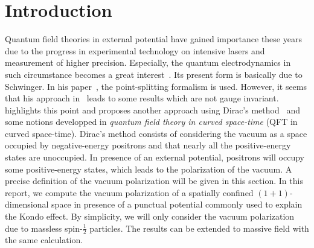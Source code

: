 \section{Introduction}
Quantum field theories in external potential have gained importance these years due to the progress in experimental technology on intensive lasers and measurement of higher precision.
Especially, the quantum electrodynamics in such circumstance becomes a great interest~\cite{Mohr1998}. 
Its present form is basically due to Schwinger. 
In his paper~\cite{Schwinger1951}, the point-splitting formalism is used. 
However, it seems that his approach in~\cite{Schwinger1951} leads to some results which are not gauge invariant. 
\cite{Zahn2015} highlights this point and proposes another approach using Dirac's method~\cite{Dirac1934} and some notions developped in \textit{quantum field theory in curved space-time} (QFT in curved space-time). 
Dirac's method consists of considering the vacuum as a space occupied by negative-energy positrons and that nearly all the positive-energy states are unoccupied.
In presence of an external potential, positrons will occupy some positive-energy states, which leads to the polarization of the vacuum.
A precise definition of the vacuum polarization will be given in this section.
In this report, we compute the vacuum polarization of a spatially confined $(1+1)$-dimensional space in presence of a punctual potential commonly used to explain the Kondo effect. 
By simplicity, we will only consider the vacuum polarization due to massless spin-$\frac 1 2$ particles.
The results can be extended to massive field with the same calculation.
\\\\
%
%
%
